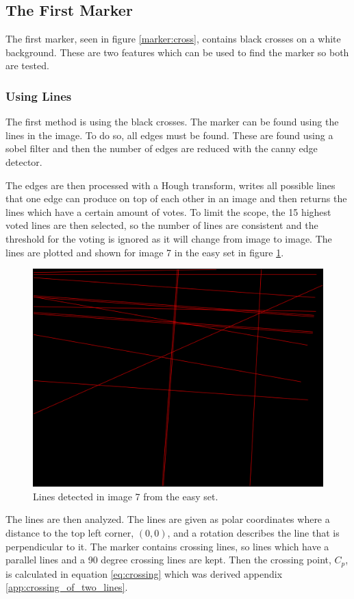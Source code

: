 \subsection{The First Marker}
The first marker, seen in figure \ref{marker:cross}, contains black crosses on a white background.
These are two features which can be used to find the marker so both are tested.

\subsubsection{Using Lines}
The first method is using the black crosses.
The marker can be found using the lines in the image.
To do so, all edges must be found.
These are found using a sobel filter and then the number of edges are reduced with the canny edge detector.

The edges are then processed with a Hough transform, writes all possible lines that one edge can produce on top of each other in an image and then returns the lines which have a certain amount of votes.
To limit the scope, the 15 highest voted lines are then selected, so the number of lines are consistent and the threshold for the voting is ignored as it will change from image to image.
The lines are plotted and shown for image 7 in the easy set in figure \ref{fig:lines_in_image}.


\begin{figure}[h]
 \centering
 \includegraphics[width=0.6\linewidth]{graphics/Lines_in_image}
 \caption{Lines detected in image 7 from the easy set.}
 \label{fig:lines_in_image}
\end{figure}


The lines are then analyzed.
The lines are given as polar coordinates where a distance to the top left corner, $(0,0)$, and a rotation describes the line that is perpendicular to it.
The marker contains crossing lines, so lines which have a parallel lines and a 90 degree crossing lines are kept.
Then the crossing point, $C_p$, is calculated in equation \ref{eq:crossing} which was derived appendix \ref{app:crossing_of_two_lines}.

